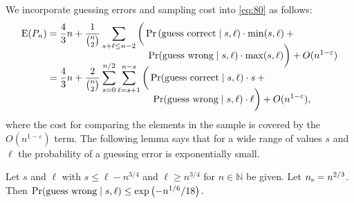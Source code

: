 \documentclass[prodmode,acmtalg]{acmsmall}
\newcommand{\E}{\textnormal{\textrm{E}}}
\newcommand{\Samplesize}{\ensuremath{n_{\textnormal{\textrm{s}}}}}
\begin{document}
We incorporate guessing errors and sampling cost into \eqref{eq:80} as follows:
\begin{align}\label{eq:500}
    \E(P_n) &= \frac{4}{3} n + 
    \frac{1}{\binom{n}{2}} \sum_{s + \ell \leq n
    - 2}\bigg(\Pr\left(\text{guess
    correct} \mid s, \ell\right) \cdot \min(s, \ell){} +{}\notag \\[-1em]&\quad\quad\quad\quad\quad\quad\quad\quad\quad\quad\,\,\Pr(\text{guess wrong} \mid s, \ell) \cdot
	\max(s, \ell)\bigg) + O(n^{1 - \varepsilon})\notag\\[-1em]
    &=  \frac{4}{3}n + \frac{2}{\binom{n}{2}}\sum_{s=0}^{n/2}\sum_{\ell =
s+1}^{n-s} \bigg(\Pr(\text{guess correct} \mid s, \ell) \cdot
s{} +{} \notag\\[-1em]
&\quad\quad\quad\quad\quad\quad\quad\quad\quad\quad\,\,\,\,\,\Pr(\text{guess
wrong} \mid s, \ell) \cdot \ell\bigg) + O(n^{1 - \varepsilon}),
\end{align}
where the cost for comparing the elements in the sample is covered by the $O(n^{1 - \varepsilon})$ term.
The following lemma says that for a wide range of values $s$ and $\ell$ the
probability of a guessing error is exponentially small. 
\begin{lemma}\label{lem:estimation:error}
    Let $s$ and $\ell$ with $s \leq \ell - n^{3/4}$ and $\ell \geq n^{3/4}$ for
    $n \in \mathbb{N}$ be given.
    Let $\textnormal{\Samplesize} = n^{2/3}$. Then 
    $\Pr(\textnormal{guess wrong} \mid s, \ell) \leq \exp\left(-n^{1/6}/18\right).$
\end{lemma}
\end{document}
